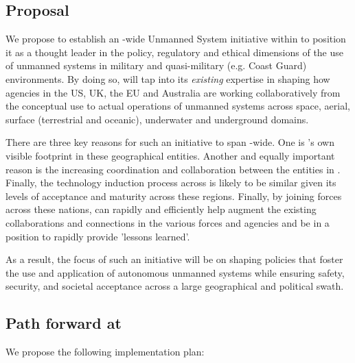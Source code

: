 \documentclass[10pt,letterpaper]{article}
\begin{document}
\subsection{Proposal}

We propose to establish an \auke-wide Unmanned System initiative
within \org to position it as a thought leader in the policy,
regulatory and ethical dimensions of the use of unmanned systems in
military and quasi-military (e.g. Coast Guard) environments. By doing
so, \org will tap into its \emph{existing} expertise in shaping how
agencies in the US, UK, the EU and Australia are working
collaboratively from the conceptual use to actual operations of
unmanned systems across space, aerial, surface (terrestrial and
oceanic), underwater and underground domains.

There are three key reasons for such an initiative to span \auke-wide.
One is \orge's own visible footprint in these geographical
entities. Another and equally important reason is the increasing
coordination and collaboration between the entities in \auke. Finally,
the technology induction process across \auk is likely to be similar
given its levels of acceptance and maturity across these
regions. Finally, by joining forces across these nations, \org can
rapidly and efficiently help augment the existing collaborations and
connections in the various forces and agencies and be in a position to
rapidly provide 'lessons learned'.

As a result, the focus of such an initiative will be on shaping
policies that foster the use and application of autonomous unmanned
systems while ensuring safety, security, and societal acceptance
across a large geographical and political swath.


\subsection{Path forward at \org}

We propose the following implementation plan:
\end{document}
